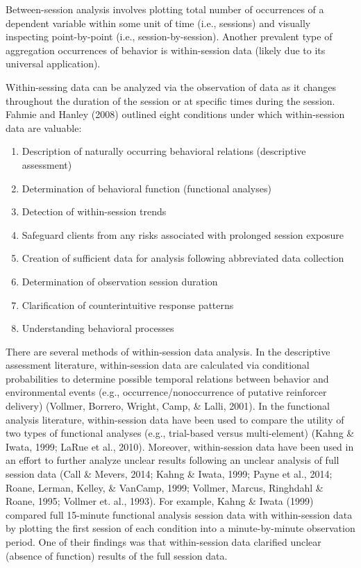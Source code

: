 Between-session analysis involves plotting total number of occurrences of a dependent variable within some unit of time (i.e., sessions) and visually inspecting point-by-point (i.e., session-by-session). Another prevalent type of aggregation occurrences of behavior is within-session data (likely due to its universal application). 

Within-sessing data can be analyzed via the observation of data as it changes throughout the duration of the session or at specific times during the session. Fahmie and Hanley (2008) outlined eight conditions under which within-session data are valuable:
\begin{enumerate}
\item Description of naturally occurring behavioral relations (descriptive assessment) 
\item Determination of behavioral function (functional analyses)
\item Detection of within-session trends
\item Safeguard clients from any risks associated with prolonged session exposure
\item Creation of sufficient data for analysis following abbreviated data collection
\item Determination of observation session duration
\item Clarification of counterintuitive response patterns
\item Understanding behavioral processes
\end{enumerate}

There are several methods of within-session data analysis. In the descriptive assessment literature, within-session data are calculated via conditional probabilities to determine possible temporal relations between behavior and environmental events (e.g., occurrence/nonoccurrence of putative reinforcer delivery) (Vollmer, Borrero, Wright, Camp, \& Lalli, 2001). In the functional analysis literature, within-session data have been used to compare the utility of two types of functional analyses (e.g., trial-based versus multi-element) (Kahng \& Iwata, 1999; LaRue et al., 2010). Moreover, within-session data have been used in an effort to further analyze unclear results following an unclear analysis of full session data (Call \& Mevers, 2014; Kahng \& Iwata, 1999; Payne et al., 2014; Roane, Lerman, Kelley, \& VanCamp, 1999; Vollmer, Marcus, Ringhdahl \& Roane, 1995; Vollmer et. al., 1993). For example, Kahng \& Iwata (1999) compared full 15-minute functional analysis session data with within-session data by plotting the first session of each condition into a minute-by-minute observation period. One of their findings was that within-session data clarified unclear (absence of function) results of the full session data. 

